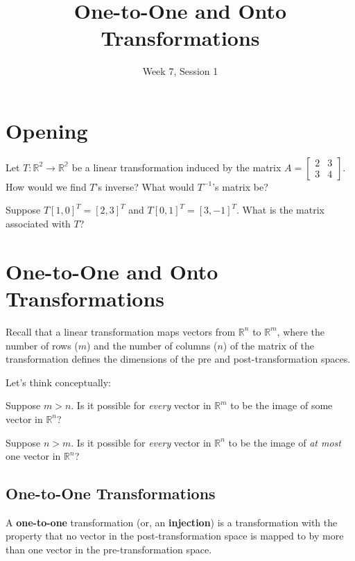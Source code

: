 \documentclass[11pt]{exam}
\title{One-to-One and Onto Transformations}
\date{Week 7, Session 1}
\begin{document}
\maketitle

\section{Opening}
    
    \vspace{20px}
    \begin{questions}
        \item Let $T: \mathbb{R}^2 \rightarrow \mathbb{R^2}$ be a linear transformation induced by the matrix $A = \begin{bmatrix} 2 & 3 \\ 3 & 4 \end{bmatrix}$.
        How would we find $T$'s inverse? What would $T^{-1}$'s matrix be?
        \item Suppose $T[1,0]^T = [2,3]^T$ and $T[0,1]^T = [3,-1]^T$. What is the matrix associated with $T$?
    \end{questions}

\pagebreak
\section{One-to-One and Onto Transformations}
    
    \vspace{20px}
    Recall that a linear transformation maps vectors from $\mathbb{R}^n$ to $\mathbb{R}^m$, where the number of rows ($m$)
    and the number of columns ($n$) of the matrix of the transformation defines the dimensions of the pre and post-transformation spaces.

    Let's think conceptually:
    \begin{questions}
        \item Suppose $m > n$. Is it possible for \textit{every} vector in $\mathbb{R}^m$ to be the image of some vector in $\mathbb{R}^n$?
        \item Suppose $n > m$. Is it possible for \textit{every} vector in $\mathbb{R}^n$ to be the image of
        \textit{at most} one vector in $\mathbb{R}^n$?
    \end{questions}

    \vspace{20px}
    \subsection{One-to-One Transformations}
    A \textbf{one-to-one} transformation (or, an \textbf{injection}) is a transformation with the property that no vector in the post-transformation
    space is mapped to by more than one vector in the pre-transformation space.
\end{document}
